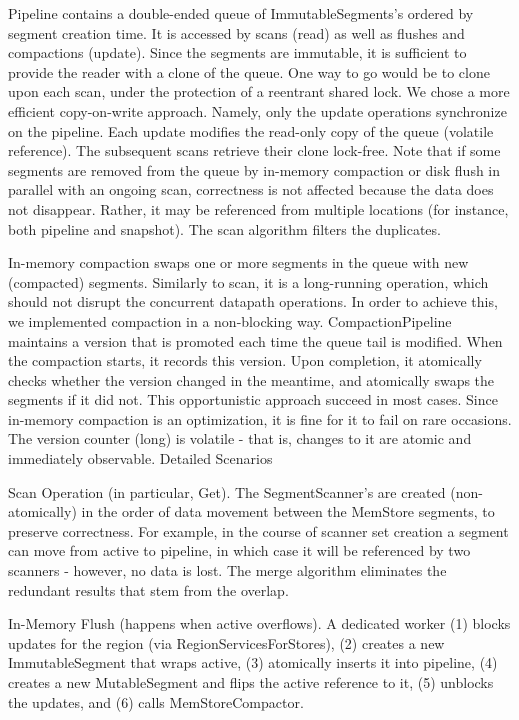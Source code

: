


Pipeline contains a double-ended queue of ImmutableSegments’s ordered by segment creation time. It is accessed by scans (read) as well as flushes and compactions (update). Since the segments are immutable, it is sufficient to provide the reader with a clone of the queue. One way to go would be to clone upon each scan, under the protection of a reentrant shared lock. We chose a more efficient copy-on-write approach. Namely, only the update operations synchronize on the pipeline. Each update modifies the read-only copy of the queue (volatile reference). The subsequent scans retrieve their clone lock-free. Note that if some segments are removed from the queue by in-memory compaction or disk flush in parallel with an ongoing scan, correctness is not affected because the data does not disappear. Rather, it may be referenced from multiple locations (for instance, both pipeline and snapshot). The scan algorithm filters the duplicates. 

In-memory compaction swaps one or more segments in the queue with new (compacted) segments. Similarly to scan, it is a long-running operation, which should not disrupt the concurrent datapath operations. In order to achieve this, we implemented compaction in a non-blocking way. CompactionPipeline maintains a version that is promoted each time the queue tail is modified. When the compaction starts, it records this version. Upon completion, it atomically checks whether the version changed in the meantime, and atomically swaps the segments if it did not. This opportunistic approach succeed in most cases. Since in-memory compaction is an optimization, it is fine for it to fail on rare occasions. The version counter (long) is volatile - that is, changes to it are atomic and immediately observable. 
Detailed Scenarios

Scan Operation (in particular, Get). The SegmentScanner’s are created (non-atomically) in the order of data movement between the MemStore segments, to preserve correctness. For example, in the course of scanner set creation a segment can move from active to pipeline, in which case it will be referenced by two scanners - however, no data is lost. The merge algorithm eliminates the redundant results that stem from the overlap.

In-Memory Flush (happens when active overflows). A dedicated worker (1) blocks updates for the region (via RegionServicesForStores), (2) creates a new ImmutableSegment that wraps active, (3) atomically inserts it into pipeline, (4) creates a new MutableSegment and flips the active reference to it, (5) unblocks the updates, and (6) calls MemStoreCompactor. 

